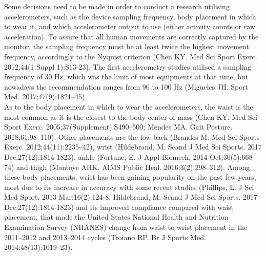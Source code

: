 \documentclass[11pt]{article}
\begin{document}
Some decisions need to be made in order to conduct a research utilising accelerometers, such as the device sampling frequency, body placement in which to wear it, and which accelerometer output to use (either activity counts or raw acceleration). To assure that all human movements are correctly captured by the monitor, the sampling frequency must be at least twice the highest movement frequency, accordingly to the Nyquist criterion {\tiny (Chen KY. Med Sci Sport Exerc. 2012;44(1 Suppl 1):S13-23)}. The first accelerometry studies utilised a sampling frequency of 30 Hz, which was the limit of most equipments at that time, but nowadays the recommendation ranges from 90 to 100 Hz {\tiny (Migueles JH. Sport Med. 2017;47(9):1821–45)}. \\

As to the body placement in which to wear the accelerometers, the waist is the most common as it is the closest to the body center of mass {\tiny (Chen KY. Med Sci Sport Exerc. 2005;37(Supplement):S490–500; Mendes MA. Gait Posture. 2018;61:98–110)}. Other placements are the low back {\tiny (Brandes M. Med Sci Sports Exerc. 2012;44(11):2235–42)}, wrist {\tiny (Hildebrand, M. Scand J Med Sci Sports. 2017 Dec;27(12):1814-1823)}, ankle {\tiny (Fortune, E. J Appl Biomech. 2014 Oct;30(5):668-74)} and thigh {\tiny (Montoye AHK. AIMS Public Heal. 2016;3(2):298–312)}. Among these body placements, wrist has been gaining popularity on the past few years, most due to its increase in accuracy with  some recent studies {\tiny (Phillips, L. J Sci Med Sport. 2013 Mar;16(2):124-8, Hildebrand, M. Scand J Med Sci Sports. 2017 Dec;27(12):1814-1823)} and its improved compliance compared with waist placement, that made the United States National Health and Nutrition Examination Survey (NHANES) change from waist to wrist placement in the 2011–2012 and 2013–2014 cycles {\tiny (Troiano RP. Br J Sports Med. 2014;48(13):1019–23)}.
\end{document}
